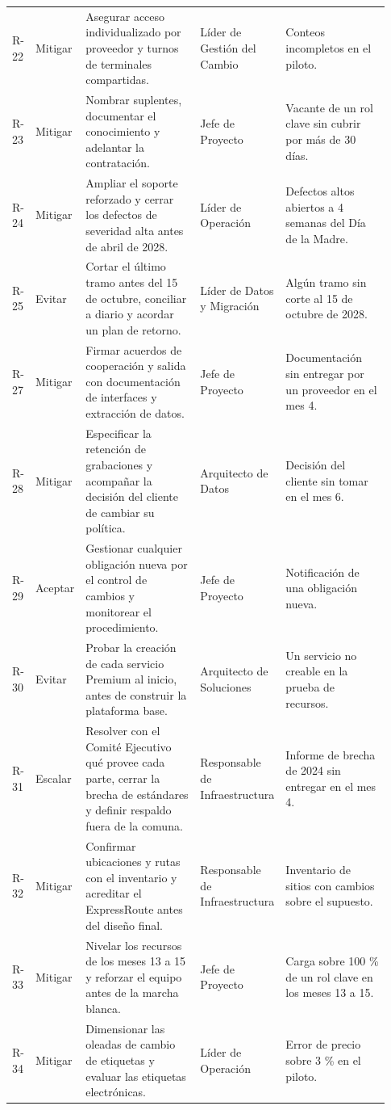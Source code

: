 \documentclass[11pt]{article}
\begin{document}
\begin{longtable}{p{0.065\linewidth}p{0.102\linewidth}p{0.316\linewidth}p{0.158\linewidth}p{0.288\linewidth}}
R-22 & Mitigar & Asegurar acceso individualizado por proveedor y turnos de terminales compartidas. & Líder de Gestión del Cambio & Conteos incompletos en el piloto. \\
R-23 & Mitigar & Nombrar suplentes, documentar el conocimiento y adelantar la contratación. & Jefe de Proyecto & Vacante de un rol clave sin cubrir por más de 30 días. \\
R-24 & Mitigar & Ampliar el soporte reforzado y cerrar los defectos de severidad alta antes de abril de 2028. & Líder de Operación & Defectos altos abiertos a 4 semanas del Día de la Madre. \\
R-25 & Evitar & Cortar el último tramo antes del 15 de octubre, conciliar a diario y acordar un plan de retorno. & Líder de Datos y Migración & Algún tramo sin corte al 15 de octubre de 2028. \\
R-27 & Mitigar & Firmar acuerdos de cooperación y salida con documentación de interfaces y extracción de datos. & Jefe de Proyecto & Documentación sin entregar por un proveedor en el mes 4. \\
R-28 & Mitigar & Especificar la retención de grabaciones y acompañar la decisión del cliente de cambiar su política. & Arquitecto de Datos & Decisión del cliente sin tomar en el mes 6. \\
R-29 & Aceptar & Gestionar cualquier obligación nueva por el control de cambios y monitorear el procedimiento. & Jefe de Proyecto & Notificación de una obligación nueva. \\
R-30 & Evitar & Probar la creación de cada servicio Premium al inicio, antes de construir la plataforma base. & Arquitecto de Soluciones & Un servicio no creable en la prueba de recursos. \\
R-31 & Escalar & Resolver con el Comité Ejecutivo qué provee cada parte, cerrar la brecha de estándares y definir respaldo fuera de la comuna. & Responsable de Infraestructura & Informe de brecha de 2024 sin entregar en el mes 4. \\
R-32 & Mitigar & Confirmar ubicaciones y rutas con el inventario y acreditar el ExpressRoute antes del diseño final. & Responsable de Infraestructura & Inventario de sitios con cambios sobre el supuesto. \\
R-33 & Mitigar & Nivelar los recursos de los meses 13 a 15 y reforzar el equipo antes de la marcha blanca. & Jefe de Proyecto & Carga sobre 100 \% de un rol clave en los meses 13 a 15. \\
R-34 & Mitigar & Dimensionar las oleadas de cambio de etiquetas y evaluar las etiquetas electrónicas. & Líder de Operación & Error de precio sobre 3 \% en el piloto. \\

\end{longtable}
\end{document}
